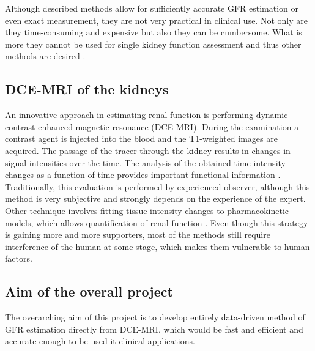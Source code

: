 Although described methods allow for sufficiently accurate GFR estimation or even exact measurement, they are not very practical in clinical use. 
Not only are they time-consuming and expensive but also they can be cumbersome. What is more they cannot be used for single kidney function assessment and thus other methods are desired \cite{bokacheva2008assessment}.

\subsection{DCE-MRI of the kidneys}
An innovative approach in estimating renal function is performing dynamic contrast-enhanced magnetic resonance (DCE-MRI). During the examination a contrast agent is injected into the blood and the T1-weighted images are acquired. The passage of the tracer through the kidney results in changes in signal intensities over the time.
The analysis of the obtained time-intensity changes as a function of time provides important functional information \cite{bokacheva2008assessment, khalifa2014models}. Traditionally, this evaluation is performed by experienced observer, although this method is very subjective and strongly depends on the experience of the expert. Other technique involves fitting tissue intensity changes to pharmacokinetic models, which allows quantification of renal function \cite{khalifa2014models}. Even though this strategy is gaining more and more supporters, most of the methods still require interference of the human at some stage, which makes them vulnerable to human factors. 


\subsection{Aim of the overall project}
The overarching aim of this project is to develop entirely data-driven method of GFR estimation directly from DCE-MRI, which would be fast and efficient and accurate enough to be used it clinical applications.  
